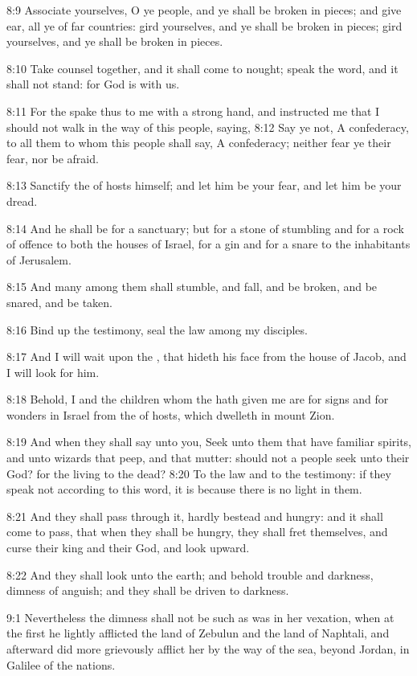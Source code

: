 8:9 Associate yourselves, O ye people, and ye shall be broken in pieces; and give ear, all ye of far countries: gird yourselves, and ye shall be broken in pieces; gird yourselves, and ye shall be broken in pieces.

8:10 Take counsel together, and it shall come to nought; speak the word, and it shall not stand: for God is with us.

8:11 For the \LORD spake thus to me with a strong hand, and instructed me that I should not walk in the way of this people, saying, 8:12 Say ye not, A confederacy, to all them to whom this people shall say, A confederacy; neither fear ye their fear, nor be afraid.

8:13 Sanctify the \LORD of hosts himself; and let him be your fear, and let him be your dread.

8:14 And he shall be for a sanctuary; but for a stone of stumbling and for a rock of offence to both the houses of Israel, for a gin and for a snare to the inhabitants of Jerusalem.

8:15 And many among them shall stumble, and fall, and be broken, and be snared, and be taken.

8:16 Bind up the testimony, seal the law among my disciples.

8:17 And I will wait upon the \LORD, that hideth his face from the house of Jacob, and I will look for him.

8:18 Behold, I and the children whom the \LORD hath given me are for signs and for wonders in Israel from the \LORD of hosts, which dwelleth in mount Zion.

8:19 And when they shall say unto you, Seek unto them that have familiar spirits, and unto wizards that peep, and that mutter: should not a people seek unto their God? for the living to the dead?  8:20 To the law and to the testimony: if they speak not according to this word, it is because there is no light in them.

8:21 And they shall pass through it, hardly bestead and hungry: and it shall come to pass, that when they shall be hungry, they shall fret themselves, and curse their king and their God, and look upward.

8:22 And they shall look unto the earth; and behold trouble and darkness, dimness of anguish; and they shall be driven to darkness.

9:1 Nevertheless the dimness shall not be such as was in her vexation, when at the first he lightly afflicted the land of Zebulun and the land of Naphtali, and afterward did more grievously afflict her by the way of the sea, beyond Jordan, in Galilee of the nations.

